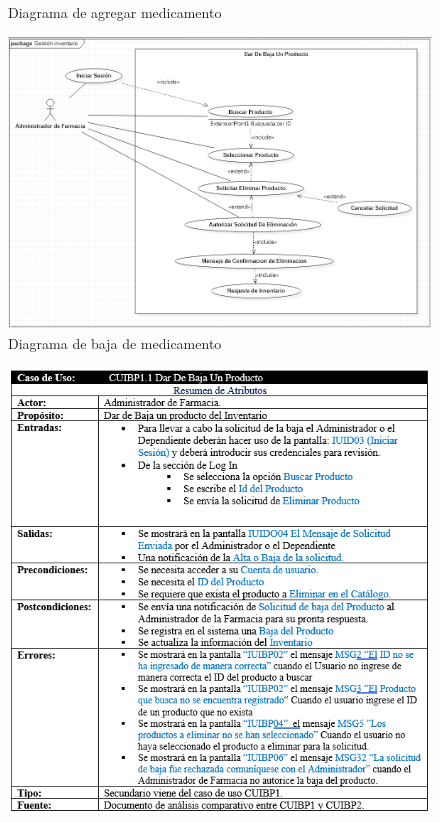 \documentclass[12pt,letterpaper]{article}
\begin{document}
{\begin{figure}[H]
            \caption{Diagrama de agregar medicamento}
        \end{figure}
        \begin{figure}[H]
            \centering
            \includegraphics [scale=0.5]{bajaProducto}
            \caption{Diagrama de baja de medicamento}
        \end{figure}
        \begin{figure}[H]
            \centering
            \includegraphics [scale=0.9]{especificacionBajaProducto}

\end{figure}}
\end{document}
